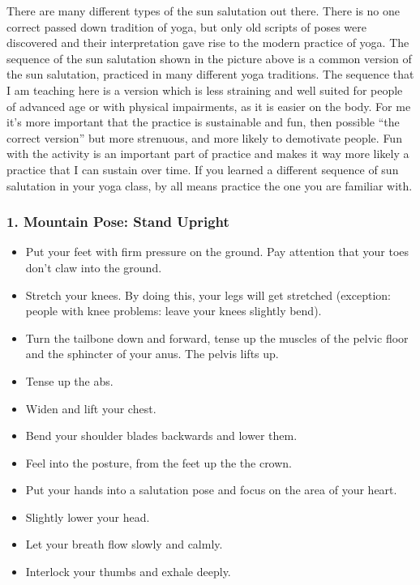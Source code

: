 \documentclass[../Book.Stress_regulation.tex]{subfiles}
\begin{document}
There are many different types of the sun salutation out there.
There is no one correct passed down tradition of yoga, but only old scripts of poses were discovered and their interpretation gave rise to the modern practice of yoga.
The sequence of the sun salutation shown in the picture above is a common version of the sun salutation, practiced in many different yoga traditions.
The sequence that I am teaching here is a version which is less straining and well suited for people of advanced age or with physical impairments, as it is easier on the body\cite{VidyaYoga}.
For me it's more important that the practice is sustainable and fun, then possible ``the correct version'' but more strenuous, and more likely to demotivate people.
Fun with the activity is an important part of practice and makes it way more likely a practice that I can sustain over time.
If you learned a different sequence of sun salutation in your yoga class, by all means  practice the one you are familiar with. 
\newpage

\subsubsection{1. Mountain Pose: Stand Upright}
\begin{itemize}
\item Put your feet with firm pressure on the ground. Pay attention that your toes don't claw into the ground.
\item Stretch your knees. By doing this, your legs will get stretched (exception: people with knee problems: leave your knees slightly bend).
\item Turn the tailbone down and forward, tense up the muscles of the pelvic floor and the sphincter of your anus. The pelvis lifts up.
\item Tense up the abs.
\item Widen and lift your chest.
\item Bend your shoulder blades backwards and lower them.
\item Feel into the posture, from the feet up the the crown.
\item Put your hands into a salutation pose and focus on the area of your heart.
\item Slightly lower your head.
\item Let your breath flow slowly and calmly.
\item Interlock your thumbs and exhale deeply.
\end{itemize}
\end{document}
